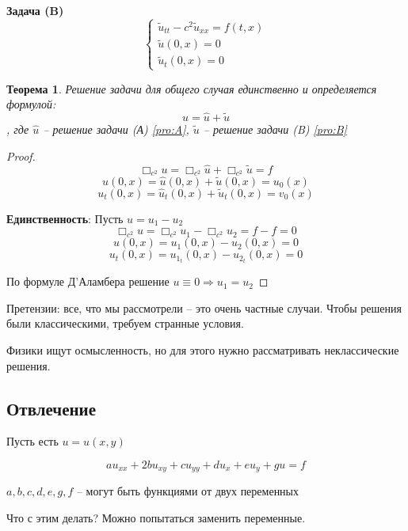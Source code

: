 \documentclass[12pt]{report}
\newtheorem{theorem}{Теорема}
\begin{document}
\textbf{Задача (B)}
\begin{equation} \label{pro:B}
    \begin{cases}
        \tilde{u}_{tt} - c ^ 2 \tilde{u}_{xx} = f(t, x)
        \\
        \tilde{u}(0, x) = 0
        \\
        \tilde{u}_t(0, x) = 0
    \end{cases}
\end{equation}

\begin{theorem}
    Решение задачи для общего случая единственно и определяется формулой: 
    $$u = \hat{u} + \tilde{u}$$
    , где $\hat{u}$ -- решение задачи (А) \eqref{pro:A}, $\tilde{u}$ -- решение задачи (B) \eqref{pro:B}
\end{theorem}

\begin{proof}
    $$\Box_{c ^ 2} u = \Box_{c ^ 2} \hat{u} + \Box_{c ^ 2} \tilde{u} = f$$
    $$u(0, x) = \hat{u}(0, x) + \tilde{u}(0, x) = u_0(x)$$
    $$u_t(0, x) = \hat{u}_t(0, x) + \tilde{u}_t(0, x) = v_0(x)$$
    
    \textbf{Единственность}: 
    Пусть $u = u_1 - u_2$
    $$\Box_{c ^ 2} u = \Box_{c ^ 2} u_1 - \Box_{c ^ 2} u_2 = f - f = 0$$
    $$u(0, x) = u_1(0, x) - u_2(0, x) = 0$$
    $$u_t(0, x) = u_{1_t} (0, x) - u_{2_t}(0, x) = 0$$
    
    По формуле Д'Аламбера решение $u \equiv 0 \Longrightarrow u_1 = u_2$
\end{proof}

Претензии: все, что мы рассмотрели -- это очень частные случаи. Чтобы решения были классическими, требуем странные условия. 

Физики ищут осмысленность, но для этого нужно рассматривать неклассические решения. 

\subsection{Отвлечение}

Пусть есть $u = u(x, y)$ 

\begin{equation} \label{eq:abc}
    au_{xx} + 2bu_{xy} + cu_{yy} + du_x + eu_y + gu = f
\end{equation}

$a, b, c, d, e, g, f$ -- могут быть функциями от двух переменных 

Что с этим делать? Можно попытаться заменить переменные. 
\end{document}
